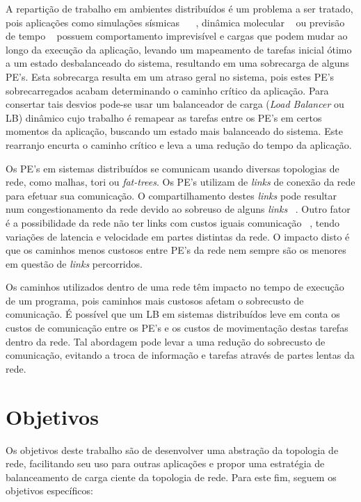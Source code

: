\documentclass[
	12pt,				%
	openright,			%
	twoside,			%
	a4paper,			%
	english,			%
	brazil,				%
	]{abntex2}
\begin{document}
A repartição de trabalho em ambientes distribuídos é um problema a ser tratado, pois aplicações como simulações sísmicas ~\cite{dupros} ~\cite{tesser}, dinâmica molecular ~\cite{bathele-kale} ou previsão de tempo ~\cite{rodrigues} possuem comportamento imprevisível e cargas que podem mudar ao longo da execução da aplicação, levando um mapeamento de tarefas inicial ótimo a um estado desbalanceado do sistema, resultando em uma sobrecarga de alguns PE’s. Esta sobrecarga resulta em um atraso geral no sistema, pois estes PE’s sobrecarregados acabam determinando o caminho crítico da aplicação. Para consertar tais desvios pode-se usar um balanceador de carga (\textit{Load Balancer} ou LB) dinâmico cujo trabalho é remapear as tarefas entre os PE’s em certos momentos da aplicação, buscando um estado mais balanceado do sistema. Este rearranjo encurta o caminho crítico e leva a uma redução do tempo da aplicação.

Os PE’s em sistemas distribuídos se comunicam usando diversas topologias de rede, como malhas, tori ou \textit{fat-trees}. Os PE's utilizam de \textit{links} de conexão da rede para efetuar sua comunicação. O compartilhamento destes \textit{links} pode resultar num congestionamento da rede devido ao sobreuso de alguns \textit{links} ~\cite{bathele-encyclopedia}. Outro fator é a possibilidade da rede não ter links com custos iguais comunicação ~\cite{dragonfly}, tendo variações de latencia e velocidade em partes distintas da rede. O impacto disto é que os caminhos menos custosos entre PE's da rede nem sempre são os menores em questão de \textit{links} percorridos. 

Os caminhos utilizados dentro de uma rede têm impacto no tempo de execução de um programa, pois caminhos mais custosos afetam o sobrecusto de comunicação. É possível que um LB em sistemas distribuídos leve em conta os custos de comunicação entre os PE's e os custos de movimentação destas tarefas dentro da rede. Tal abordagem pode levar a uma redução do sobrecusto de comunicação, evitando a troca de informação e tarefas através de partes lentas da rede.

\section{Objetivos}
\label{sec:objetivos}

Os objetivos deste trabalho são de desenvolver uma abstração da topologia de rede, facilitando seu uso para outras aplicações e propor uma estratégia de balanceamento de carga ciente da topologia de rede. Para este fim, seguem os objetivos específicos:
\end{document}

